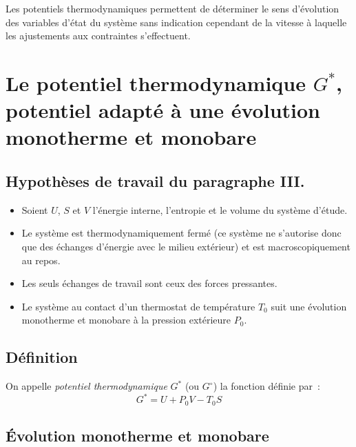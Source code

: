 \documentclass{article}
\begin{document}
\begin{remarque}[Remarque]
    Les potentiels thermodynamiques permettent de déterminer le sens d'évolution des variables d'état du système sans indication cependant de la vitesse à laquelle les ajustements aux contraintes s'effectuent.
\end{remarque}

\section{Le potentiel thermodynamique $G^*$, potentiel adapté à une évolution monotherme et monobare}
\subsection{Hypothèses de travail du paragraphe \textsf{III.}}
\begin{itemize}
    \item Soient $U$, $S$ et $V$ l'énergie interne, l'entropie et le volume du système d'étude.
    \item Le système est thermodynamiquement fermé (ce système ne s'autorise donc que des échanges d'énergie avec le milieu extérieur) et est macroscopiquement au repos.
    \item Les seuls échanges de travail sont ceux des forces pressantes.
    \item Le système au contact d'un thermostat de température $T_0$ suit une évolution monotherme et monobare à la pression extérieure $P_0$.
\end{itemize}

\subsection{Définition}
\begin{enonce}
    On appelle \textit{potentiel thermodynamique} $G^*$ (ou $G^\circ$) la fonction définie par~:
    $$G^* = U + P_0V - T_0S$$
\end{enonce}

\subsection{Évolution monotherme et monobare}
\end{document}
